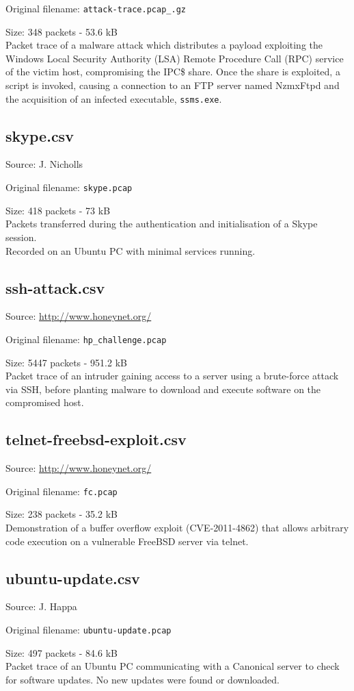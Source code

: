 \documentclass[12pt,a4paper]{article}
\newcommand{\dbl}{\\[\baselineskip]}
\begin{document}
            Original filename: \verb!attack-trace.pcap_.gz!

            Size: 348 packets - 53.6 kB\dbl
            Packet trace of a malware attack which distributes a
            payload exploiting the Windows Local Security Authority
            (LSA) Remote Procedure Call (RPC) service of the victim
            host, compromising the IPC\$ share. Once the share is
            exploited, a script is invoked, causing a connection to an
            FTP server named NzmxFtpd and the acquisition of an
            infected executable, \verb!ssms.exe!.

        \subsection{skype.csv}
            Source: J. Nicholls

            Original filename: \verb|skype.pcap|

            Size: 418 packets - 73 kB\dbl
            Packets transferred during the authentication and
            initialisation of a Skype session.\\ Recorded on an Ubuntu
            PC with minimal services running.

        \subsection{ssh-attack.csv}
            Source: \url{http://www.honeynet.org/}

            Original filename: \verb|hp_challenge.pcap|

            Size: 5447 packets - 951.2 kB\dbl
            Packet trace of an intruder gaining access to a server
            using a brute-force attack via SSH, before planting malware
            to download and execute software on the compromised host.

        \subsection{telnet-freebsd-exploit.csv}
            Source: \url{http://www.honeynet.org/}

            Original filename: \verb|fc.pcap|

            Size: 238 packets - 35.2 kB\dbl
            Demonstration of a buffer overflow exploit (CVE-2011-4862)
            that allows arbitrary code execution on a vulnerable
            FreeBSD server via telnet.

        \subsection{ubuntu-update.csv}
            Source: J. Happa

            Original filename: \verb|ubuntu-update.pcap|

            Size: 497 packets - 84.6 kB\dbl
            Packet trace of an Ubuntu PC communicating with a Canonical
            server to check for software updates. No new updates were
            found or downloaded.
\end{document}
